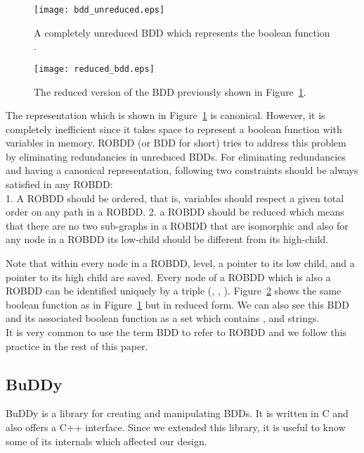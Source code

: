 \documentclass[4pt]{article}
\begin{document}
\begin{figure} [ht]
\begin{center}
\texttt{[image: bdd\_unreduced.eps]}
\end{center}

\caption{
A completely unreduced BDD which represents the boolean function .
}
\label{bdd_unreduced}

\end{figure}


\begin{figure}
\begin{center}
\texttt{[image: reduced\_bdd.eps]}
\end{center}
\caption{The reduced version of the BDD previously shown in Figure~\ref{bdd_unreduced}.}
\label{reduced_bdd}
\end{figure}

The representation which is shown in Figure~\ref{bdd_unreduced} is canonical. However, it is completely inefficient since it takes  space to represent a boolean function with  variables in memory. ROBDD (or BDD for short) tries to address this problem by eliminating redundancies in unreduced BDDs. For eliminating redundancies and having a canonical representation, following two constraints should be always satisfied in any ROBDD:\\
1. A ROBDD should be ordered, that is, variables should respect a given total order on any path in a ROBDD. 2. a ROBDD should be reduced which means that there are no two sub-graphs in a ROBDD that are isomorphic and also for any node in a ROBDD its low-child should be different from its high-child.

Note that within every node in a ROBDD, level, a pointer to its low child, and a pointer to its high child are saved. Every node of a ROBDD  which is also a ROBDD can be identified uniquely by a triple (, , ). Figure~\ref{reduced_bdd} shows the same boolean function as in Figure~\ref{bdd_unreduced} but in reduced form. We can also see this BDD and its associated boolean function as a set which contains ,  and  strings.\\
It is very common to use the term BDD to refer to ROBDD and we follow this practice in the rest of this paper.

\subsection{BuDDy}
\label{buddy_sec}
BuDDy \cite{buddy} is a library for creating and manipulating BDDs. It is written in C and also offers a C++ interface. Since we extended this library, it is useful to know some of its internals which affected our design.
\end{document}
